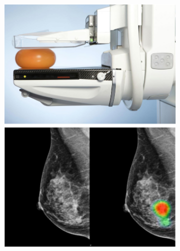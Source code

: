 \begin{figure}
     \centering
     \begin{subfigure}[t]{0.32\textwidth}
         \centering
         \includegraphics[width=\textwidth]{figure/introdution/mammogram}
         \label{subfig:mammography}
     \end{subfigure}
     \begin{subfigure}[t]{0.32\textwidth}
         \centering

\end{subfigure}
\end{figure}
